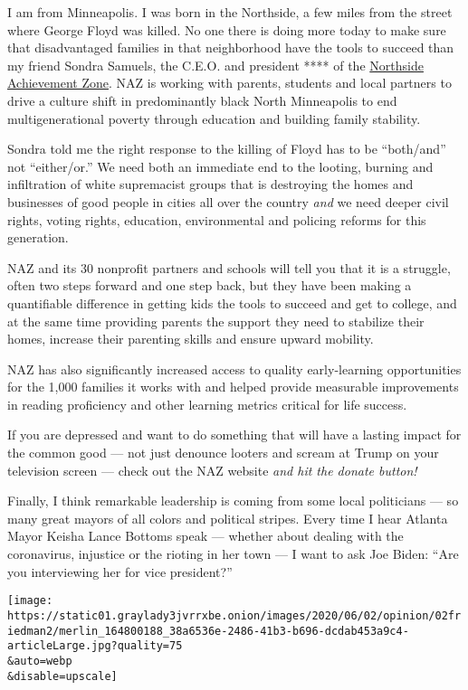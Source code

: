 I am from Minneapolis. I was born in the Northside, a few miles from the
street where George Floyd was killed. No one there is doing more today
to make sure that disadvantaged families in that neighborhood have the
tools to succeed than my friend Sondra Samuels, the C.E.O. and president
**** of the \href{https://northsideachievement.org/}{Northside
Achievement Zone}. NAZ is working with parents, students and local
partners to drive a culture shift in predominantly black North
Minneapolis to end multigenerational poverty through education and
building family stability.

Sondra told me the right response to the killing of Floyd has to be
``both/and'' not ``either/or.'' We need both an immediate end to the
looting, burning and infiltration of white supremacist groups that is
destroying the homes and businesses of good people in cities all over
the country \emph{and} we need deeper civil rights, voting rights,
education, environmental and policing reforms for this generation.

NAZ and its 30 nonprofit partners and schools will tell you that it is a
struggle, often two steps forward and one step back, but they have been
making a quantifiable difference in getting kids the tools to succeed
and get to college, and at the same time providing parents the support
they need to stabilize their homes, increase their parenting skills and
ensure upward mobility.

NAZ has also significantly increased access to quality early-learning
opportunities for the 1,000 families it works with and helped provide
measurable improvements in reading proficiency and other learning
metrics critical for life success.

If you are depressed and want to do something that will have a lasting
impact for the common good --- not just denounce looters and scream at
Trump on your television screen --- check out the NAZ website \emph{and
hit the donate button!}

Finally, I think remarkable leadership is coming from some local
politicians --- so many great mayors of all colors and political
stripes. Every time I hear Atlanta Mayor Keisha Lance Bottoms speak ---
whether about dealing with the coronavirus, injustice or the rioting in
her town --- I want to ask Joe Biden: ``Are you interviewing her for
vice president?''

\texttt{[image: https://static01.graylady3jvrrxbe.onion/images/2020/06/02/opinion/02friedman2/merlin\_164800188\_38a6536e-2486-41b3-b696-dcdab453a9c4-articleLarge.jpg?quality=75\\\&auto=webp\\\&disable=upscale]}

